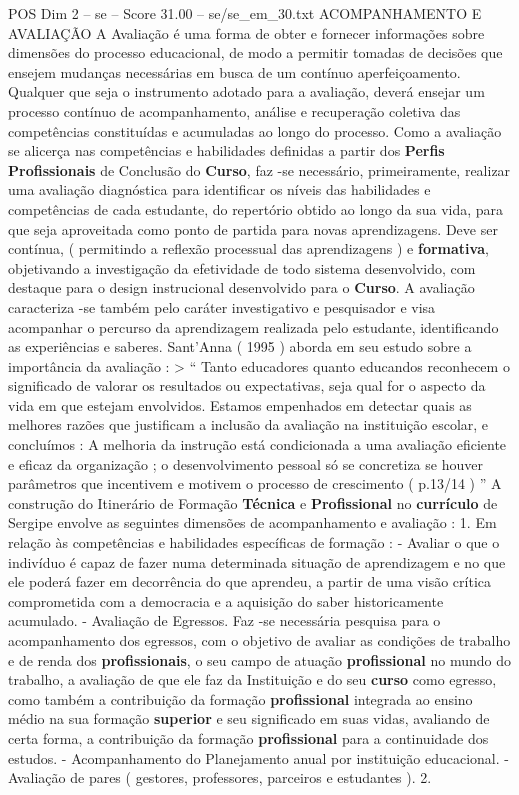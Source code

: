 \begin{textsample}{POS Dim 2 – se – Score 31.00 – se/se\_em\_30.txt}
ACOMPANHAMENTO E AVALIAÇÃO A Avaliação é uma forma de obter e fornecer informações sobre dimensões do processo educacional, de modo a permitir tomadas de decisões que ensejem mudanças necessárias em busca de um contínuo aperfeiçoamento.
Qualquer que seja o instrumento adotado para a avaliação, deverá ensejar um processo contínuo de acompanhamento, análise e recuperação coletiva das competências constituídas e acumuladas ao longo do processo.
Como a avaliação se alicerça nas competências e habilidades definidas a partir dos \textbf{Perfis} \textbf{Profissionais} de Conclusão do \textbf{Curso}, faz -se necessário, primeiramente, realizar uma avaliação diagnóstica para identificar os níveis das habilidades e competências de cada estudante, do repertório obtido ao longo da sua vida, para que seja aproveitada como ponto de partida para novas aprendizagens.
Deve ser contínua, ( permitindo a reflexão processual das aprendizagens ) e \textbf{formativa}, objetivando a investigação da efetividade de todo sistema desenvolvido, com destaque para o design instrucional desenvolvido para o \textbf{Curso}.
A avaliação caracteriza -se também pelo caráter investigativo e pesquisador e visa acompanhar o percurso da aprendizagem realizada pelo estudante, identificando as experiências e saberes.
Sant’Anna ( 1995 ) aborda em seu estudo sobre a importância da avaliação : > “ Tanto educadores quanto educandos reconhecem o significado de valorar os resultados ou expectativas, seja qual for o aspecto da vida em que estejam envolvidos.
Estamos empenhados em detectar quais as melhores razões que justificam a inclusão da avaliação na instituição escolar, e concluímos : A melhoria da instrução está condicionada a uma avaliação eficiente e eficaz da organização ; o desenvolvimento pessoal só se concretiza se houver parâmetros que incentivem e motivem o processo de crescimento ( p.13/14 ) ” A construção do Itinerário de Formação \textbf{Técnica} e \textbf{Profissional} no \textbf{currículo} de Sergipe envolve as seguintes dimensões de acompanhamento e avaliação : 1.
Em relação às competências e habilidades específicas de formação : - Avaliar o que o indivíduo é capaz de fazer numa determinada situação de aprendizagem e no que ele poderá fazer em decorrência do que aprendeu, a partir de uma visão crítica comprometida com a democracia e a aquisição do saber historicamente acumulado. - Avaliação de Egressos.
Faz -se necessária pesquisa para o acompanhamento dos egressos, com o objetivo de avaliar as condições de trabalho e de renda dos \textbf{profissionais}, o seu campo de atuação \textbf{profissional} no mundo do trabalho, a avaliação de que ele faz da Instituição e do seu \textbf{curso} como egresso, como também a contribuição da formação \textbf{profissional} integrada ao ensino médio na sua formação \textbf{superior} e seu significado em suas vidas, avaliando de certa forma, a contribuição da formação \textbf{profissional} para a continuidade dos estudos. - Acompanhamento do Planejamento anual por instituição educacional. - Avaliação de pares ( gestores, professores, parceiros e estudantes ). 2.

\end{textsample}
